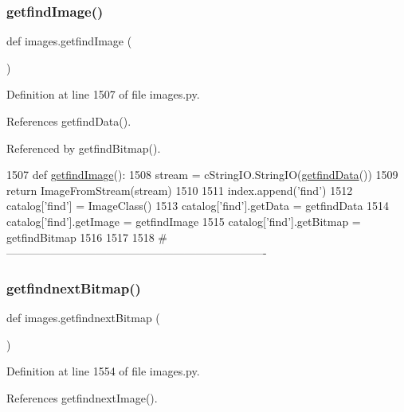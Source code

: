 \subsubsection{\texorpdfstring{getfind\+Image()}{getfindImage()}}
{\footnotesize\ttfamily def images.\+getfind\+Image (\begin{DoxyParamCaption}{ }\end{DoxyParamCaption})}



Definition at line 1507 of file images.\+py.



References getfind\+Data().



Referenced by getfind\+Bitmap().


\begin{DoxyCode}
1507 \textcolor{keyword}{def }\hyperlink{namespaceimages_a826840371cb79df70eac1eba3add721d}{getfindImage}():
1508     stream = cStringIO.StringIO(\hyperlink{namespaceimages_a6a60138ccf8d2891b14779cc5e54c1bd}{getfindData}())
1509     \textcolor{keywordflow}{return} ImageFromStream(stream)
1510 
1511 index.append(\textcolor{stringliteral}{'find'})
1512 catalog[\textcolor{stringliteral}{'find'}] = ImageClass()
1513 catalog[\textcolor{stringliteral}{'find'}].getData = getfindData
1514 catalog[\textcolor{stringliteral}{'find'}].getImage = getfindImage
1515 catalog[\textcolor{stringliteral}{'find'}].getBitmap = getfindBitmap
1516 
1517 
1518 \textcolor{comment}{#----------------------------------------------------------------------}
\end{DoxyCode}
\mbox{\label{namespaceimages_a3fda326344336dedf2589b44ed009507}} 
\subsubsection{\texorpdfstring{getfindnext\+Bitmap()}{getfindnextBitmap()}}
{\footnotesize\ttfamily def images.\+getfindnext\+Bitmap (\begin{DoxyParamCaption}{ }\end{DoxyParamCaption})}



Definition at line 1554 of file images.\+py.



References getfindnext\+Image().


